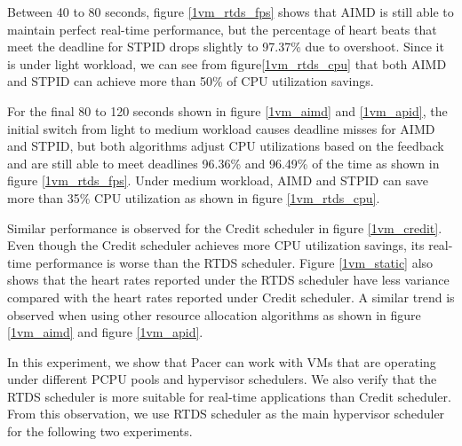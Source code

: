 Between 40 to 80 seconds, figure \ref{1vm_rtds_fps} shows that AIMD is still able to maintain perfect real-time performance, but the percentage of heart beats that meet  the deadline for STPID drops slightly to 97.37\% due to overshoot. Since it is under light workload, we can see from figure\ref{1vm_rtds_cpu} that both AIMD and STPID can achieve more than 50\% of CPU utilization savings. 

For the final 80 to 120 seconds shown in figure \ref{1vm_aimd} and \ref{1vm_apid}, the initial switch from light to medium workload causes deadline misses for AIMD and STPID, but both algorithms adjust CPU utilizations based on the feedback and are still able to meet deadlines 96.36\% and 96.49\% of the time as shown in figure \ref{1vm_rtds_fps}. Under medium workload, AIMD and STPID can save more than 35\% CPU utilization as shown in figure \ref{1vm_rtds_cpu}.


Similar performance is observed for the Credit scheduler in figure \ref{1vm_credit}. Even though the Credit scheduler achieves more CPU utilization savings, its real-time performance is worse than the RTDS scheduler. Figure \ref{1vm_static} also shows that the heart rates reported under the RTDS scheduler have less variance compared with the heart rates reported under Credit scheduler. A similar trend is observed when using other resource allocation algorithms as shown in figure \ref{1vm_aimd} and figure \ref{1vm_apid}. 

In this experiment, we show that Pacer can work with VMs that are operating under different PCPU pools and hypervisor schedulers. We also verify that the RTDS scheduler is more suitable for real-time applications than Credit scheduler. From this observation, we use RTDS scheduler as the main hypervisor scheduler for the following two experiments. 









